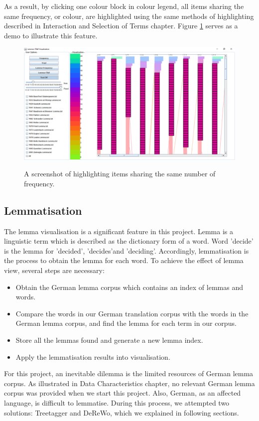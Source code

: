 As a result, by clicking one colour block in colour legend, all items sharing the same frequency, or colour, are highlighted using the same methods of highlighting described in Interaction and Selection of Terms chapter. Figure \ref{fig:interactiveColourMapping} serves as a demo to illustrate this feature.
\begin{figure}[H]
	\centering	
	\includegraphics[width=\textwidth]{Figs/Colour-Legend-Interation}\\[1ex]
	\caption{A screenshot of highlighting items sharing the same number of frequency.}
	\label{fig:interactiveColourMapping}
\end{figure} 

\subsection{Lemmatisation}

The lemma visualisation is a significant feature in this project. Lemma is a linguistic term which is described as the dictionary form of a word. Word 'decide' is the lemma for 'decided', 'decides'and 'deciding'. Accordingly, lemmatisation is the process to obtain the lemma for each word. To achieve the effect of lemma view, several steps are necessary:
\begin{itemize}
	\item \textbf{} Obtain the German lemma corpus which contains an index of lemmas and words.
	\item \textbf{} Compare the words in our German translation corpus with the words in the German lemma corpus, and find the lemma for each term in our corpus.
	\item \textbf{} Store all the lemmas  found and generate a new lemma index.
	\item \textbf{} Apply the lemmatisation results into visualisation.
\end{itemize}
For this project, an inevitable dilemma is the limited resources of German lemma corpus. As illustrated in Data Characteristics chapter, no relevant German lemma corpus was provided when we start this project. Also, German, as an affected language, is difficult to lemmatise. During this process, we attempted two solutions: Treetagger and DeReWo, which we explained in following sections.

